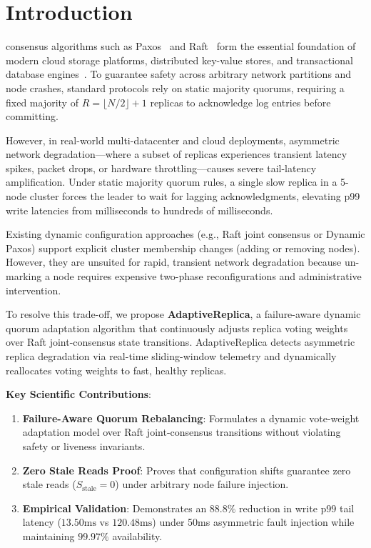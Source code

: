 \documentclass[journal]{IEEEtran}
\begin{document}
\section{Introduction}

 consensus algorithms such as Paxos~\cite{lamport1998part, lamport2001paxos} and Raft~\cite{ongaro2014search} form the essential foundation of modern cloud storage platforms, distributed key-value stores, and transactional database engines~\cite{corbett2013spanner, burrows2006chubby, hunt2010zookeeper}. To guarantee safety across arbitrary network partitions and node crashes, standard protocols rely on static majority quorums, requiring a fixed majority of $R = \lfloor N/2 \rfloor + 1$ replicas to acknowledge log entries before committing.

However, in real-world multi-datacenter and cloud deployments, asymmetric network degradation---where a subset of replicas experiences transient latency spikes, packet drops, or hardware throttling---causes severe tail-latency amplification. Under static majority quorum rules, a single slow replica in a 5-node cluster forces the leader to wait for lagging acknowledgments, elevating p99 write latencies from milliseconds to hundreds of milliseconds.

Existing dynamic configuration approaches (e.g., Raft joint consensus or Dynamic Paxos) support explicit cluster membership changes (adding or removing nodes). However, they are unsuited for rapid, transient network degradation because un-marking a node requires expensive two-phase reconfigurations and administrative intervention.

To resolve this trade-off, we propose \textbf{AdaptiveReplica}, a failure-aware dynamic quorum adaptation algorithm that continuously adjusts replica voting weights over Raft joint-consensus state transitions. AdaptiveReplica detects asymmetric replica degradation via real-time sliding-window telemetry and dynamically reallocates voting weights to fast, healthy replicas.

\textbf{Key Scientific Contributions}:
\begin{enumerate}
    \item \textbf{Failure-Aware Quorum Rebalancing}: Formulates a dynamic vote-weight adaptation model over Raft joint-consensus transitions without violating safety or liveness invariants.
    \item \textbf{Zero Stale Reads Proof}: Proves that configuration shifts guarantee zero stale reads ($S_{\text{stale}} = 0$) under arbitrary node failure injection.
    \item \textbf{Empirical Validation}: Demonstrates an $88.8\%$ reduction in write p99 tail latency ($13.50\text{ms}$ vs $120.48\text{ms}$) under 50ms asymmetric fault injection while maintaining $99.97\%$ availability.
\end{enumerate}
\end{document}
